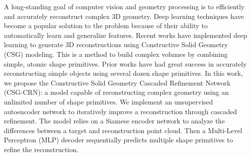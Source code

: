 
A long-standing goal of computer vision and geometry processing is to efficiently and accurately reconstruct complex 3D geometry. Deep learning techniques have become a popular solution to the problem because of their ability to automatically learn and generalize features. Recent works have implemented deep learning to generate 3D reconstructions using Constructive Solid Geometry (CSG) modeling. This is a method to build complex volumes by combining simple, atomic shape primitives. Prior works have had great success in accurately reconstructing simple objects using several dozen shape primitives. In this work, we propose the Constructive Solid Geometry Cascaded Refinement Network (CSG-CRN): a model capable of reconstructing complex geometry using an unlimited number of shape primitives. We implement an unsupervised autoencoder network to iteratively improve a reconstruction through cascaded refinement. The model relies on a Siamese encoder network to analyze the differences between a target and reconstruction point cloud. Then a Multi-Level Perceptron (MLP) decoder sequentially predicts multiple shape primitives to refine the reconstruction.

\vspace{2em}


